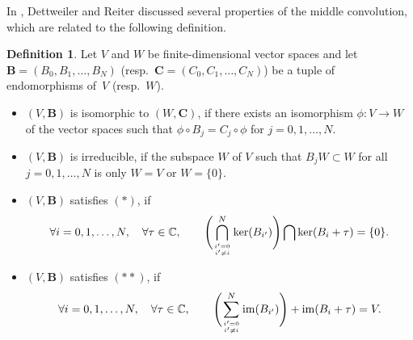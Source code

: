 \documentclass[pdftex]{sigma}
\numberwithin{equation}{section}
\theoremstyle{definition}
\newtheorem{Definition}[Theorem]{Definition}
\begin{document}
In \cite{DR1,DR2}, Dettweiler and Reiter discussed several properties of the middle convolution, which are related to the following definition.
\begin{Definition} \label{def:condqmc}
Let $V$ and $W$ be finite-dimensional vector spaces and let $\boldsymbol{B} = ( B_0, B_1, \dots , B_N)$ (resp.~$\boldsymbol{C} = ( C_0, C_1, \dots , C_N)$) be a tuple of endomorphisms of~$V$ (resp.~$W$).
\begin{itemize}\itemsep=0pt
\item[(i)] $(V, \boldsymbol{B} )$ is isomorphic to $(W, \boldsymbol{C})$, if there exists an isomorphism $\phi \colon V \to W$ of the vector spaces such that $\phi \circ B_j = C_j \circ \phi $ for $j=0,1,\dots ,N$.
\item[(ii)] $(V,\boldsymbol{B} )$ is irreducible, if the subspace $W$ of $V$ such that $B_j W \subset W$ for all $j=0,1,\dots ,N$ is only $W=V$ or $W=\{ 0 \} $.
\item[(iii)] $(V,\boldsymbol{B} )$ satisfies $(*)$, if
\begin{equation}
 \forall i=0,1,\dots ,N,\quad \forall \tau \in \mathbb{C} , \qquad \Biggl( \bigcap _{i' =0 \atop{i'\neq i} }^N \operatorname{ker}(B_{i'} ) \Biggr) \bigcap \operatorname{ker}(B_{i} +\tau ) =\{ 0\}.
\label{eq:def*}
\end{equation}
\item[(iv)] $(V,\boldsymbol{B} )$ satisfies $(**)$, if
\begin{equation}
 \forall i=0,1,\dots ,N, \quad \forall \tau \in \mathbb{C} , \qquad \Biggl( \sum_{i' =0 \atop{i'\neq i} }^N \operatorname{im}(B_{i'} ) \Biggr) + \operatorname{im}(B_{i} +\tau ) = V.
\label{eq:def**}
\end{equation}
\end{itemize}
\end{Definition}
\end{document}
